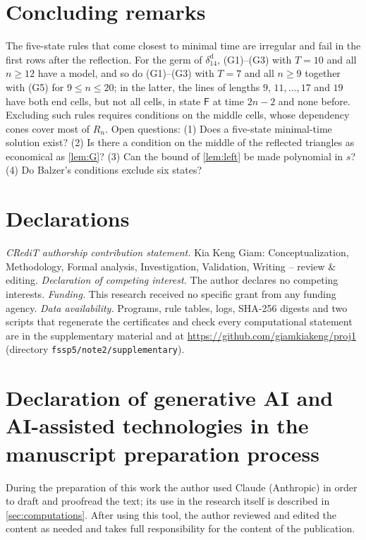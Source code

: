 \documentclass[3p]{elsarticle}
\theoremstyle{definition}
\newcommand{\Fq}{\mathsf F}
\begin{document}
\section{Concluding remarks}\label{sec:conclusion}

The five-state rules that come closest to minimal time are irregular and fail
in the first rows after the reflection. For the germ of
$\delta_{14}^{\mathrm d}$, (G1)--(G3) with $T=10$ and all $n\ge12$ have a
model, and so do (G1)--(G3) with $T=7$ and all $n\ge9$ together with (G5) for
$9\le n\le20$; in the latter, the lines of lengths $9$, $11,\dots,17$ and $19$
have both end cells, but not all cells, in state $\Fq$ at time $2n-2$ and none
before. Excluding such rules requires
conditions on the middle cells, whose dependency cones cover most of $R_n$.
Open questions: (1) Does a five-state minimal-time solution exist? (2) Is there
a condition on the middle of the reflected triangles as economical as
\cref{lem:G}? (3) Can the bound of \cref{lem:left} be made polynomial in $s$?
(4) Do Balzer's conditions exclude six states?

\section*{Declarations}
\noindent\emph{CRediT authorship contribution statement.} Kia Keng Giam:
Conceptualization, Methodology, Formal analysis, Investigation, Validation,
Writing -- review \& editing. \emph{Declaration of competing interest.} The
author declares no competing interests. \emph{Funding.} This research received
no specific grant from any funding agency. \emph{Data availability.}
Programs, rule tables, logs, SHA-256 digests and two scripts that regenerate
the certificates and check every computational statement are in the
supplementary material and at \url{https://github.com/giamkiakeng/proj1}
(directory \texttt{fssp5/note2/supplementary}).

\section*{Declaration of generative AI and AI-assisted technologies in the
manuscript preparation process}
During the preparation of this work the author used Claude (Anthropic) in
order to draft and proofread the text; its use in the research itself is
described in \cref{sec:computations}. After using this tool, the author
reviewed and edited the content as needed and takes full responsibility for
the content of the publication.

\renewcommand{\bibfont}{\footnotesize}


\end{document}
